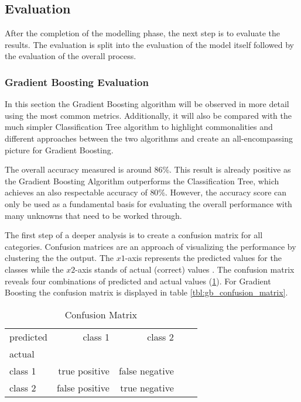 \subsection{Evaluation}

After the completion of the modelling phase, the next step is to evaluate the results. The evaluation is split into 
the evaluation of the model itself followed by the evaluation of the overall process. 

\subsubsection{Gradient Boosting Evaluation}

In this section the Gradient Boosting algorithm will be observed in more detail using the most common metrics. Additionally, it will also
be compared with the much simpler Classification Tree algorithm to highlight commonalities and different approaches between 
the two algorithms and create an all-encompassing picture for Gradient Boosting. 

The overall accuracy measured is around \(86\)\%. This result is already positive as the Gradient Boosting Algorithm outperforms 
the Classification Tree, which achieves an also respectable accuracy of \(80\)\%. However, the accuracy score can only be used as a
fundamental basis for evaluating the overall performance with many unknowns that need to be worked through.

The first step of a deeper analysis is to create a confusion matrix for all categories. Confusion matrices are an approach of 
visualizing the performance by clustering the the output. The \(x1\)-axis represents the predicted values for the classes 
while the \(x2\)-axis stands of actual (correct) values \cite[p. 235]{Davis_2006}. The confusion matrix reveals four combinations of predicted 
and actual values (\ref{tbl:evaluation_confusion_matrix}). For Gradient Boosting the confusion matrix is displayed in table \ref{tbl:gb_confusion_matrix}.

\begin{table}[H]
  \centering
  \begin{tabular}{lrrrr}
    \toprule
    predicted & class 1         &  class 2          \\
    actual    &                 &                   \\
    \midrule
    class 1   &  true positive  &  false negative   \\
    class 2   &  false positive &  true negative    \\
    \bottomrule
    \end{tabular}
  \caption{Confusion Matrix}%
  \label{tbl:evaluation_confusion_matrix}%
\end{table} 

